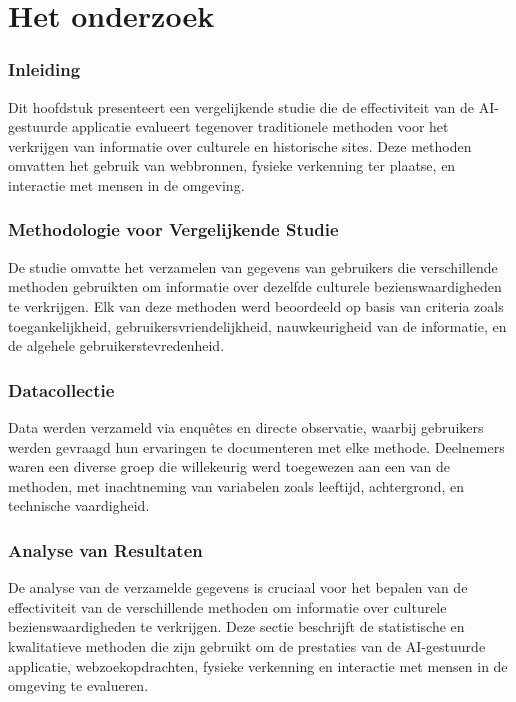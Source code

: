 \chapter{Het onderzoek}%
\label{ch:Het onderzoek}

\subsection{Inleiding}
Dit hoofdstuk presenteert een vergelijkende studie die de effectiviteit van de AI-gestuurde applicatie evalueert tegenover traditionele methoden voor het verkrijgen van informatie over culturele en historische sites. Deze methoden omvatten het gebruik van webbronnen, fysieke verkenning ter plaatse, en interactie met mensen in de omgeving.

\subsection{Methodologie voor Vergelijkende Studie}
De studie omvatte het verzamelen van gegevens van gebruikers die verschillende methoden gebruikten om informatie over dezelfde culturele bezienswaardigheden te verkrijgen. Elk van deze methoden werd beoordeeld op basis van criteria zoals toegankelijkheid, gebruikersvriendelijkheid, nauwkeurigheid van de informatie, en de algehele gebruikerstevredenheid.

\subsection{Datacollectie}
Data werden verzameld via enquêtes en directe observatie, waarbij gebruikers werden gevraagd hun ervaringen te documenteren met elke methode. Deelnemers waren een diverse groep die willekeurig werd toegewezen aan een van de methoden, met inachtneming van variabelen zoals leeftijd, achtergrond, en technische vaardigheid.

\subsection{Analyse van Resultaten}
De analyse van de verzamelde gegevens is cruciaal voor het bepalen van de effectiviteit van de verschillende methoden om informatie over culturele bezienswaardigheden te verkrijgen. Deze sectie beschrijft de statistische en kwalitatieve methoden die zijn gebruikt om de prestaties van de AI-gestuurde applicatie, webzoekopdrachten, fysieke verkenning en interactie met mensen in de omgeving te evalueren.


